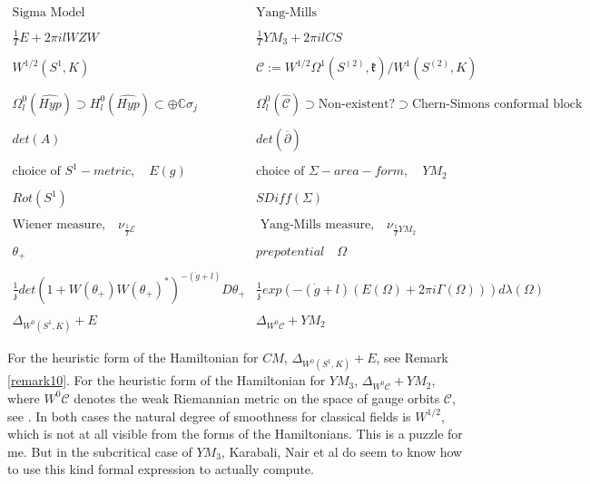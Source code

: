 \documentclass{amsart}
\theoremstyle{conjecture}
\theoremstyle{definition}
\theoremstyle{question}
\theoremstyle{questions}
\theoremstyle{remark}
\theoremstyle{remarks}
\theoremstyle{example}
\numberwithin{equation}{section}
\begin{document}
$$\begin{matrix} \text{Sigma Model} &\text{Yang-Mills}\\
\\
\frac{1}{T} E+2\pi i l WZW & \frac{1}{T} YM_3+2\pi i l CS\\
\\
W^{1/2}(S^1,K)&\mathcal C:=W^{1/2}\Omega^1(S^{(2)},\mathfrak k)/W^1(S^{(2)},K)\\
\\
\Omega_l^0(\widehat{Hyp})\supset H_l^0(\widehat{Hyp})\subset \oplus \mathbb C \sigma_j& \Omega_l^0(\widehat{\mathcal C})\supset \text{Non-existent?} \supset \text{Chern-Simons conformal block}\\
\\
det(A) & det(\overline{\partial})\\
\\
\text{choice of } S^1-metric,\quad  E(g)&\text{choice of }\Sigma -area-form,\quad YM_2\\
\\
Rot(S^1)&SDiff(\Sigma )\\

\\
\text{Wiener measure,}\quad\nu_{\frac 1T\mathcal E}&\text{ Yang-Mills
measure,}\quad\nu_{\frac 1T YM_2}\\
\\

\theta_+ & prepotential \quad \Omega \\
\\
\frac{1}{\mathfrak z}det(1+W(\theta_+)W(\theta_+)^*)^{-(\dot g+l)}D\theta_+& \frac{1}{\mathfrak z}exp(-(\dot g+l)(E(\Omega)+2\pi i\Gamma(\Omega)))d\lambda(\Omega)\\
\\
\Delta_{W^0(S^1,K)}+E &  \Delta_{W^{0}\mathcal C}+YM_2

\end{matrix}
$$

For the heuristic form of the Hamiltonian for $CM$, $\Delta_{W^0(S^1,K)}+E$, see Remark \ref{remark10}. For the heuristic form of the Hamiltonian for $YM_3$, $\Delta_{W^{0}\mathcal C}+YM_2$, where $W^{0}\mathcal C$ denotes the weak Riemannian metric on the space
of gauge orbits $\mathcal C$, see \cite{Mitter}. In both cases the natural degree of smoothness for classical fields is $W^{1/2}$, which is not at all visible from the forms of the Hamiltonians. This is a puzzle for me. But in the subcritical case of $YM_3$, Karabali, Nair et al do seem to know how to use this kind formal expression to actually compute.
\end{document}
